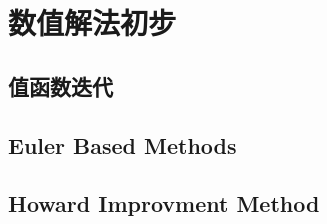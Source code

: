 
\section{数值解法初步}  \label{sec-numerical-methods-pre}



%
\subsection{值函数迭代}




%
\subsection{Euler Based Methods}




%
\subsection{Howard Improvment Method}